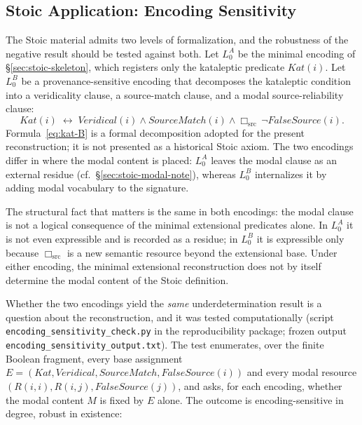 \documentclass[11pt]{article}
\theoremstyle{plain}
\theoremstyle{definition}
\theoremstyle{remark}
\begin{document}


\subsection{Stoic Application: Encoding Sensitivity}
\label{sec:encoding-sensitivity}

The Stoic material admits two levels of formalization, and the
robustness of the negative result should be tested against both. Let
$L_0^A$ be the minimal encoding of \S\ref{sec:stoic-skeleton}, which
registers only the kataleptic predicate $Kat(i)$. Let $L_0^B$ be a
provenance-sensitive encoding that decomposes the kataleptic condition
into a veridicality clause, a source-match clause, and a modal
source-reliability clause:
\begin{equation}
Kat(i) \;\longleftrightarrow\; Veridical(i) \wedge SourceMatch(i)
\wedge \Box_{\mathrm{src}}\,\neg FalseSource(i).
\label{eq:kat-B}
\end{equation}
Formula~\eqref{eq:kat-B} is a formal decomposition adopted for the
present reconstruction; it is not presented as a historical Stoic
axiom. The two encodings differ in where the modal content is placed:
$L_0^A$ leaves the modal clause as an external residue (cf.\
\S\ref{sec:stoic-modal-note}), whereas $L_0^B$ internalizes it by
adding modal vocabulary to the signature.

The structural fact that matters is the same in both encodings: the
modal clause is not a logical consequence of the minimal extensional
predicates alone. In $L_0^A$ it is not even expressible and is recorded
as a residue; in $L_0^B$ it is expressible only because
$\Box_{\mathrm{src}}$ is a new semantic resource beyond the
extensional base. Under either encoding, the minimal extensional
reconstruction does not by itself determine the modal content of the
Stoic definition.

Whether the two encodings yield the \emph{same} underdetermination
result is a question about the reconstruction, and it was tested
computationally (script \texttt{encoding\_sensitivity\_check.py} in
the reproducibility package; frozen output
\texttt{encoding\_sensitivity\_output.txt}). The test enumerates,
over the finite Boolean fragment, every base assignment
$E=(Kat,\allowbreak Veridical,\allowbreak SourceMatch,\allowbreak FalseSource(i))$ and every modal
resource $(R(i,i),R(i,j),FalseSource(j))$, and asks, for each
encoding, whether the modal content $M$ is fixed by $E$ alone. The
outcome is encoding-sensitive in degree, robust in existence:
\end{document}

